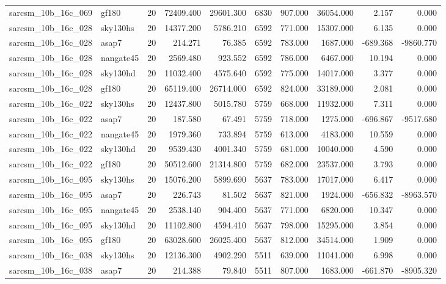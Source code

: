 \begin{longtable}{llrrrrrrrr}
sarcsm\_10b\_16c\_069 & gf180 & 20 & 72409.400 & 29601.300 & 6830 & 907.000 & 36054.000 & 2.157 & 0.000 \\
sarcsm\_10b\_16c\_028 & sky130hs & 20 & 14377.200 & 5786.210 & 6592 & 771.000 & 15307.000 & 6.135 & 0.000 \\
sarcsm\_10b\_16c\_028 & asap7 & 20 & 214.271 & 76.385 & 6592 & 783.000 & 1687.000 & -689.368 & -9860.770 \\
sarcsm\_10b\_16c\_028 & nangate45 & 20 & 2569.480 & 923.552 & 6592 & 786.000 & 6467.000 & 10.194 & 0.000 \\
sarcsm\_10b\_16c\_028 & sky130hd & 20 & 11032.400 & 4575.640 & 6592 & 775.000 & 14017.000 & 3.377 & 0.000 \\
sarcsm\_10b\_16c\_028 & gf180 & 20 & 65119.400 & 26714.000 & 6592 & 824.000 & 33189.000 & 2.081 & 0.000 \\
sarcsm\_10b\_16c\_022 & sky130hs & 20 & 12437.800 & 5015.780 & 5759 & 668.000 & 11932.000 & 7.311 & 0.000 \\
sarcsm\_10b\_16c\_022 & asap7 & 20 & 187.580 & 67.491 & 5759 & 718.000 & 1275.000 & -696.867 & -9517.680 \\
sarcsm\_10b\_16c\_022 & nangate45 & 20 & 1979.360 & 733.894 & 5759 & 613.000 & 4183.000 & 10.559 & 0.000 \\
sarcsm\_10b\_16c\_022 & sky130hd & 20 & 9539.430 & 4001.340 & 5759 & 681.000 & 10040.000 & 4.590 & 0.000 \\
sarcsm\_10b\_16c\_022 & gf180 & 20 & 50512.600 & 21314.800 & 5759 & 682.000 & 23537.000 & 3.793 & 0.000 \\
sarcsm\_10b\_16c\_095 & sky130hs & 20 & 15076.200 & 5899.690 & 5637 & 783.000 & 17017.000 & 6.417 & 0.000 \\
sarcsm\_10b\_16c\_095 & asap7 & 20 & 226.743 & 81.502 & 5637 & 821.000 & 1924.000 & -656.832 & -8963.570 \\
sarcsm\_10b\_16c\_095 & nangate45 & 20 & 2538.140 & 904.400 & 5637 & 771.000 & 6820.000 & 10.347 & 0.000 \\
sarcsm\_10b\_16c\_095 & sky130hd & 20 & 11102.800 & 4594.410 & 5637 & 798.000 & 15295.000 & 3.854 & 0.000 \\
sarcsm\_10b\_16c\_095 & gf180 & 20 & 63028.600 & 26025.400 & 5637 & 812.000 & 34514.000 & 1.909 & 0.000 \\
sarcsm\_10b\_16c\_038 & sky130hs & 20 & 12136.300 & 4902.290 & 5511 & 639.000 & 11041.000 & 6.998 & 0.000 \\
sarcsm\_10b\_16c\_038 & asap7 & 20 & 214.388 & 79.840 & 5511 & 807.000 & 1683.000 & -661.870 & -8905.320 \\

\end{longtable}
